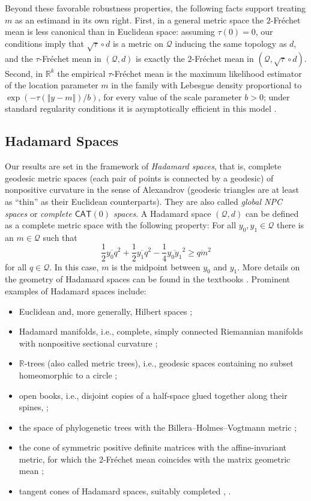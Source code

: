 \documentclass{article}
\newcommand*{\mc}[1]{\mathcal{#1}}
\newcommand{\R}{\mathbb{R}}
\newcommand{\normof}[1]{\Vert#1\Vert}
\newcommand{\ol}[2]{\overline{#1#2}}
\newcommand{\tran}{\tau}
\newcommand{\cato}{$\mathsf{CAT}(0)$}
\begin{document}
Beyond these favorable robustness properties, the following facts support treating $m$ as an estimand in its own right. First, in a general metric space the $2$-Fr\'echet mean is less canonical than in Euclidean space: assuming $\tran(0)=0$, our conditions imply that $\sqrt{\tran}\circ d$ is a metric on $\mc Q$ inducing the same topology as $d$, and the $\tran$-Fr\'echet mean in $(\mc Q,d)$ is exactly the $2$-Fr\'echet mean in $(\mc Q,\sqrt{\tran}\circ d)$. Second, in $\R^{k}$ the empirical $\tran$-Fr\'echet mean is the maximum likelihood estimator of the location parameter $m$ in the family with Lebesgue density proportional to $\exp(-\tran(\normof{y-m})/b)$, for every value of the scale parameter $b>0$; under standard regularity conditions it is asymptotically efficient in this model \cite[Theorem~5.39 and Chapter~8]{Vaart1998}.
%
%
%
\subsection{Hadamard Spaces}
%
Our results are set in the framework of \emph{Hadamard spaces}, that is, complete geodesic metric spaces (each pair of points is connected by a geodesic) of nonpositive curvature in the sense of Alexandrov (geodesic triangles are at least as ``thin'' as their Euclidean counterparts). They are also called \emph{global NPC spaces} or \emph{complete \cato{} spaces}. A Hadamard space $(\mc Q, d)$ can be defined as a complete metric space with the following property: For all $y_0, y_1 \in \mc Q$ there is an $m\in\mc Q$ such that 
\begin{equation}
    \frac12 \ol{y_0}q^2 + \frac12 \ol{y_1}q^2 - \frac14 \ol{y_0}{y_1}^2 \geq  \ol qm^2
\end{equation}
for all $q\in\mc Q$. In this case, $m$ is the midpoint between $y_0$ and $y_1$. More details on the geometry of Hadamard spaces can be found in the textbooks \cite{burago01,bacak14b}.
Prominent examples of Hadamard spaces include:
\begin{itemize}
    \item Euclidean and, more generally, Hilbert spaces \cite[Prop.\ 3.5]{sturm03};
    \item Hadamard manifolds, i.e., complete, simply connected Riemannian manifolds with nonpositive sectional curvature \cite[Prop.\ 3.1]{sturm03};
    \item $\R$-trees (also called metric trees), i.e., geodesic spaces containing no subset homeomorphic to a circle \cite{evans2008probability};
    \item open books, i.e., disjoint copies of a half-space glued together along their spines, \cite{Hotz2013};
    \item the space of phylogenetic trees with the Billera--Holmes--Vogtmann metric \cite{billera01};
    \item the cone of symmetric positive definite matrices with the affine-invariant metric, for which the $2$-Fr\'echet mean coincides with the matrix geometric mean \cite{bhatia06};
    \item tangent cones of Hadamard spaces, suitably completed \cite[Thm.\ 1.2.17]{bacak14b}, \cite[Thm.\ 9.1.44]{burago01}.
\end{itemize}
\end{document}
